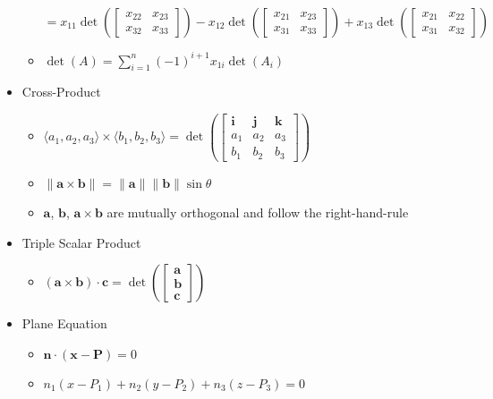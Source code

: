 \documentclass[11pt]{article}
\theoremstyle{plain}
\theoremstyle{definition}
\theoremstyle{remark}
\newcommand{\vect}[1]{\mathbf{#1}}
\newcommand{\veci}{\vect i}
\newcommand{\vecj}{\vect j}
\newcommand{\veck}{\vect k}
\newcommand{\<}{\langle}
\renewcommand{\>}{\rangle}
\begin{document}
\begin{itemize}
\begin{itemize}
        \(
            =
          x_{11}\det\left(\begin{bmatrix}
            x_{22} & x_{23} \\
            x_{32} & x_{33}
          \end{bmatrix}\right) -
          x_{12}\det\left(\begin{bmatrix}
            x_{21} & x_{23} \\
            x_{31} & x_{33}
          \end{bmatrix}\right) +
          x_{13}\det\left(\begin{bmatrix}
            x_{21} & x_{22} \\
            x_{31} & x_{32}
          \end{bmatrix}\right)
        \)
      \item
        \(\displaystyle
          \det(A) = \sum_{i=1}^{n}(-1)^{i+1}x_{1i}\det(A_i)
        \)
    \end{itemize}
  \item Cross-Product
    \begin{itemize}
      \item
        \(
          \<a_1,a_2,a_3\>\times\<b_1,b_2,b_3\>
            =
          \det\left(\begin{bmatrix}
            \veci & \vecj & \veck \\
            a_{1} & a_{2} & a_{3} \\
            b_{1} & b_{2} & b_{3}
          \end{bmatrix}\right)
        \)
      \item
        \(
          \|\vect{a}\times\vect{b}\|
            =
          \|\vect{a}\|\|\vect{b}\|\sin\theta
        \)
      \item
        \(\vect{a}\), \(\vect{b}\), \(\vect{a}\times\vect{b}\) are mutually
        orthogonal and follow the right-hand-rule
    \end{itemize}
  \item Triple Scalar Product
    \begin{itemize}
      \item
        \(
          (\vect{a}\times\vect{b})\cdot\vect{c}
            =
          \det\left(\begin{bmatrix}
            \vect{a} \\
            \vect{b} \\
            \vect{c}
          \end{bmatrix}\right)
        \)
    \end{itemize}
  \item Plane Equation
    \begin{itemize}
      \item \(\vect{n}\cdot(\vect{x}-\vect{P})=0\)
      \item \(n_1(x-P_1)+n_2(y-P_2)+n_3(z-P_3)=0\)
    \end{itemize}
\end{itemize}
\end{document}

